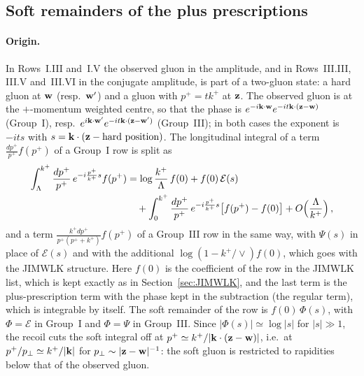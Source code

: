 \subsection{Soft remainders of the plus prescriptions}\label{sec:fin_soft}

\paragraph{Origin.} In Rows~I.III and~I.V the observed gluon in the amplitude, and in Rows~III.III, III.V and~III.VI in the conjugate amplitude, is part of a two-gluon state: a hard gluon at $\mathbf{w}$ (resp.\ $\mathbf{w}'$) and a gluon with $p^+=tk^+$ at $\mathbf{z}$. The observed gluon is at the $+$-momentum weighted centre, so that the phase is $e^{-i\mathbf{k}\cdot\mathbf{w}}e^{-it\mathbf{k}\cdot(\mathbf{z}-\mathbf{w})}$ (Group~I), resp.\ $e^{i\mathbf{k}\cdot\mathbf{w}'}e^{-it\mathbf{k}\cdot(\mathbf{z}-\mathbf{w}')}$ (Group~III); in both cases the exponent is $-its$ with $s=\mathbf{k}\cdot(\mathbf{z}-\text{hard position})$. The longitudinal integral of a term $\frac{dp^+}{p^+}f(p^+)$ of a Group~I row is split as
\begin{align}\label{eq:softsplit}
\int_\Lambda^{k^+}\frac{dp^+}{p^+}\,e^{-i\frac{p^+}{k^+}s}f(p^+)&=\log\frac{k^+}{\Lambda}\,f(0)+f(0)\,\mathcal E(s)\notag\\&\quad+\int_0^{k^+}\frac{dp^+}{p^+}\,e^{-i\frac{p^+}{k^+}s}\big[f(p^+)-f(0)\big]+O\Big(\frac{\Lambda}{k^+}\Big)\,,
\end{align}
and a term $\frac{k^+dp^+}{p^+(p^++k^+)}f(p^+)$ of a Group~III row in the same way, with $\Psi(s)$ in place of $\mathcal E(s)$ and with the additional $\log(1-k^+/\vee)f(0)$, which goes with the JIMWLK structure. Here $f(0)$ is the coefficient of the row in the JIMWLK list, which is kept exactly as in Section~\ref{sec:JIMWLK}, and the last term is the plus-prescription term with the phase kept in the subtraction (the regular term), which is integrable by itself. The soft remainder of the row is $f(0)\,\Phi(s)$, with $\Phi=\mathcal E$ in Group~I and $\Phi=\Psi$ in Group~III. Since $|\Phi(s)|\simeq\log|s|$ for $|s|\gg1$, the recoil cuts the soft integral off at $p^+\simeq k^+/|\mathbf{k}\cdot(\mathbf{z}-\mathbf{w})|$, i.e.\ at $p^+/p_\perp\simeq k^+/|\mathbf{k}|$ for $p_\perp\sim|\mathbf{z}-\mathbf{w}|^{-1}$: the soft gluon is restricted to rapidities below that of the observed gluon.

